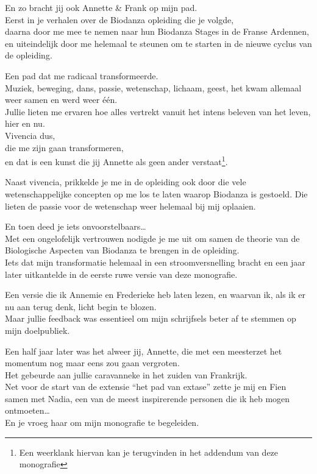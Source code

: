 \documentclass[
  11pt,
]{book}
\begin{document}
En zo bracht jij ook Annette \& Frank op mijn pad.\\
Eerst in je verhalen over de Biodanza opleiding die je volgde,\\
daarna door me mee te nemen naar hun Biodanza Stages in de Franse Ardennen,\\
en uiteindelijk door me helemaal te steunen om te starten in de nieuwe cyclus van de opleiding.

Een pad dat me radicaal transformeerde.\\
Muziek, beweging, dans, passie, wetenschap, lichaam, geest,
het kwam allemaal weer samen en werd weer één.\\
Jullie lieten me ervaren hoe alles vertrekt vanuit het intens beleven van het leven, hier en nu.\\
Vivencia dus,\\
die me zijn gaan transformeren,\\
en dat is een kunst die jij Annette als geen ander verstaat\footnote{Een weerklank hiervan kan je terugvinden in het addendum van deze monografie}.

Naast vivencia, prikkelde je me in de opleiding ook door die vele wetenschappelijke concepten op me los te laten waarop Biodanza is gestoeld.
Die lieten de passie voor de wetenschap weer helemaal bij mij oplaaien.

En toen deed je iets onvoorstelbaars\ldots{}\\
Met een ongelofelijk vertrouwen
nodigde je me uit om samen de theorie van de Biologische Aspecten van Biodanza te brengen in de opleiding.\\
Iets dat mijn transformatie helemaal in een stroomversnelling bracht en een jaar later uitkantelde in de eerste ruwe versie van deze monografie.

Een versie die ik Annemie en Frederieke heb laten lezen,
en waarvan ik, als ik er nu aan terug denk, licht begin te blozen.\\
Maar jullie feedback was essentieel om mijn schrijfsels beter af te stemmen op mijn doelpubliek.

Een half jaar later was het alweer jij, Annette,
die met een meesterzet het momentum nog maar eens zou gaan vergroten.\\
Het gebeurde aan jullie caravanneke
in het zuiden van Frankrijk.\\
Net voor de start van de extensie ``het pad van extase'' zette je mij en Fien samen met Nadia, een van de meest inspirerende personen die ik heb mogen ontmoeten\ldots{}\\
En je vroeg haar om mijn monografie te begeleiden.
\end{document}
